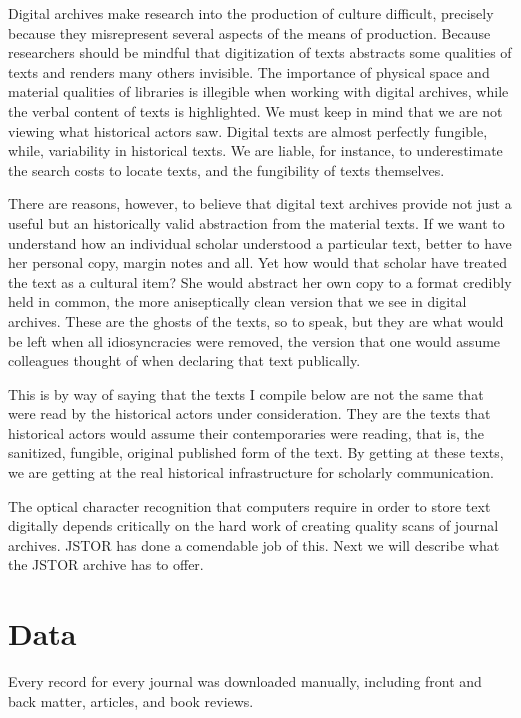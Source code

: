 \documentclass[]{book}
\theoremstyle{definition}
\theoremstyle{definition}
\theoremstyle{definition}
\theoremstyle{remark}
\begin{document}
Digital archives make research into the production of culture difficult,
precisely because they misrepresent several aspects of the means of
production. Because researchers should be mindful that digitization of
texts abstracts some qualities of texts and renders many others
invisible. The importance of physical space and material qualities of
libraries is illegible when working with digital archives, while the
verbal content of texts is highlighted. We must keep in mind that we are
not viewing what historical actors saw. Digital texts are almost
perfectly fungible, while, variability in historical texts. We are
liable, for instance, to underestimate the search costs to locate texts,
and the fungibility of texts themselves.

There are reasons, however, to believe that digital text archives
provide not just a useful but an historically valid abstraction from the
material texts. If we want to understand how an individual scholar
understood a particular text, better to have her personal copy, margin
notes and all. Yet how would that scholar have treated the text as a
cultural item? She would abstract her own copy to a format credibly held
in common, the more aniseptically clean version that we see in digital
archives. These are the ghosts of the texts, so to speak, but they are
what would be left when all idiosyncracies were removed, the version
that one would assume colleagues thought of when declaring that text
publically.

This is by way of saying that the texts I compile below are not the same
that were read by the historical actors under consideration. They are
the texts that historical actors would assume their contemporaries were
reading, that is, the sanitized, fungible, original published form of
the text. By getting at these texts, we are getting at the real
historical infrastructure for scholarly communication.

The optical character recognition that computers require in order to
store text digitally depends critically on the hard work of creating
quality scans of journal archives. JSTOR has done a comendable job of
this. Next we will describe what the JSTOR archive has to offer.

\hypertarget{kd-dd}{%
\section{Data}\label{kd-dd}}

Every record for every journal was downloaded manually, including front
and back matter, articles, and book reviews.
\end{document}
